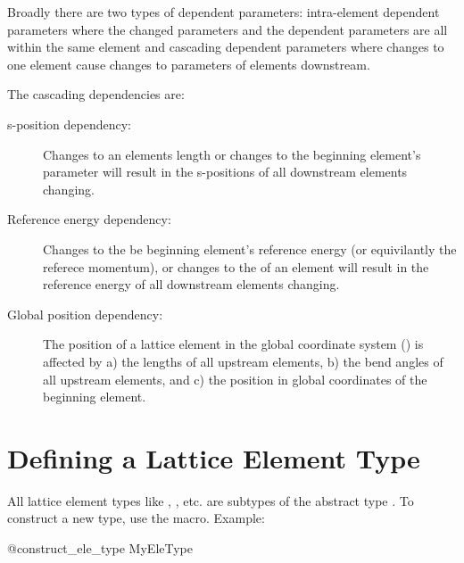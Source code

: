 Broadly there are two types of dependent parameters: intra-element dependent parameters where
the changed parameters and the dependent parameters are all within the same element and
cascading dependent parameters where changes to one element cause changes to parameters of 
elements downstream.

The cascading dependencies are:
\begin{description}
%
\item [s-position dependency:]
Changes to an elements length  or changes to the beginning element's  parameter will
result in the s-positions of all downstream elements changing.
%
\item [Reference energy dependency:] Changes to the be beginning element's reference energy (or
equivilantly the referece momentum), or changes to the  of an  element
will result in the reference energy of all downstream elements changing.
%
\item[Global position dependency:]
The position of a lattice element in the global coordinate system () is affected
by a) the lengths of all upstream elements, b) the bend angles of all upstream elements, and c)
the position in global coordinates of the beginning element.
\end{description}


\section{Defining a Lattice Element Type}
\label{s:ele.type}

All lattice element types like , , etc. are subtypes of the abstract type
. To construct a new type, use the  macro. Example:
\begin{example}
  @construct_ele_type MyEleType
\end{example}
